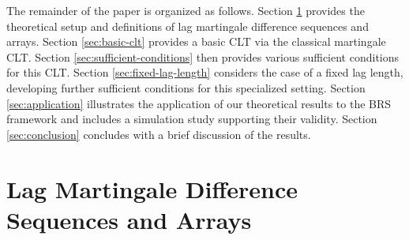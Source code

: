 \documentclass[11pt]{article}
\theoremstyle{definition}
\begin{document}
The remainder of the paper is organized as follows.
Section \ref{sec:lag-martingale} provides the theoretical setup and definitions of lag martingale difference sequences and arrays.
Section \ref{sec:basic-clt} provides a basic CLT via the classical martingale CLT.
Section \ref{sec:sufficient-conditions} then provides various sufficient conditions for this CLT.
Section \ref{sec:fixed-lag-length} considers the case of a fixed lag length, developing further sufficient conditions for this specialized setting.
Section \ref{sec:application} illustrates the application of our theoretical results to the BRS framework and includes a simulation study supporting their validity.
Section \ref{sec:conclusion} concludes with a brief discussion of the results.

\section{Lag Martingale Difference Sequences and Arrays}\label{sec:lag-martingale}
\end{document}
